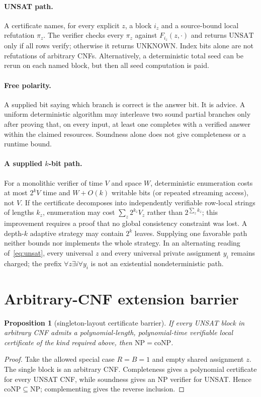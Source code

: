 \documentclass[11pt]{article}
\newtheorem{proposition}{Proposition}
\newcommand{\UNSAT}{\mathrm{UNSAT}}
\newcommand{\UNKNOWN}{\mathrm{UNKNOWN}}
\begin{document}
\paragraph{UNSAT path.}  A certificate names, for every explicit $z$, a block $i_z$ and a source-bound local refutation $\pi_z$.  The verifier checks every $\pi_z$ against $F_{i_z}(z,\cdot)$ and returns $\UNSAT$ only if all rows verify; otherwise it returns $\UNKNOWN$.  Index bits alone are not refutations of arbitrary CNFs.  Alternatively, a deterministic total seed can be rerun on each named block, but then all seed computation is paid.

\paragraph{Free polarity.}  A supplied bit saying which branch is correct is the answer bit.  It is advice.  A uniform deterministic algorithm may interleave two sound partial branches only after proving that, on every input, at least one completes with a verified answer within the claimed resources.  Soundness alone does not give completeness or a runtime bound.

\paragraph{A supplied $k$-bit path.}  For a monolithic verifier of time $V$ and space $W$, deterministic enumeration costs at most $2^kV$ time and $W+O(k)$ writable bits (or repeated streaming access), not $V$.  If the certificate decomposes into independently verifiable row-local strings of lengths $k_z$, enumeration may cost $\sum_z2^{k_z}V_z$ rather than $2^{\sum_z k_z}$; this improvement requires a proof that no global consistency constraint was lost.  A depth-$k$ adaptive strategy may contain $2^k$ leaves.  Supplying one favorable path neither bounds nor implements the whole strategy.  In an alternating reading of~\eqref{eq:unsat}, every universal $z$ and every universal private assignment $y_i$ remains charged; the prefix $\forall z\exists i\forall y_i$ is not an existential nondeterministic path.

\section{Arbitrary-CNF extension barrier}

\begin{proposition}[singleton-layout certificate barrier]
If every UNSAT block in arbitrary CNF admits a polynomial-length, polynomial-time verifiable local certificate of the kind required above, then $\mathrm{NP}=\mathrm{coNP}$.
\end{proposition}
\begin{proof}
Take the allowed special case $R=B=1$ and empty shared assignment $z$.  The single block is an arbitrary CNF.  Completeness gives a polynomial certificate for every UNSAT CNF, while soundness gives an NP verifier for UNSAT.  Hence $\mathrm{coNP}\subseteq\mathrm{NP}$; complementing gives the reverse inclusion.
\end{proof}
\end{document}
